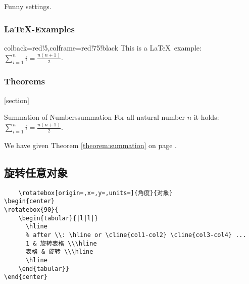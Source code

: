 \begin{tcolorbox}[skin=bicolor,colback=yellow!10,colframe=red!75!black,title=Here I am]
  
\end{tcolorbox}


\begin{tcolorbox}[colback=blue!50,colframe=blue!25!black,coltext=yellow,
    fontupper=\Large\bfseries,arc=6mm,boxrule=2mm,boxsep=5mm]
  Funny settings.
\end{tcolorbox}


\subsubsection{\LaTeX-Examples}

\begin{tcblisting}{colback=red!5,colframe=red!75!black}
This is a \LaTeX\ example:
$\displaystyle\sum\limits_{i=1}^n i = \frac{n(n+1)}{2}$.
\end{tcblisting}


\subsubsection{Theorems}

[section]
\def\themytheorem{\thesection.\arabic{mytheorem}}


\begin{theo}{Summation of Numbers}{summation}
  For all natural number $n$ it holds:\\[2mm]
  $\displaystyle\sum\limits_{i=1}^n i = \frac{n(n+1)}{2}$.
\end{theo}

We have given Theorem \ref{theorem:summation} on page \pageref{theorem:summation}.
\subsection{旋转任意对象}
\begin{shaded}
  \begin{Verbatim}
    \rotatebox[origin=,x=,y=,units=]{角度}{对象}
\begin{center}
\rotatebox{90}{
    \begin{tabular}{|l|l|}
      \hline
      % after \\: \hline or \cline{col1-col2} \cline{col3-col4} ...
      1 & 旋转表格 \\\hline
      表格 & 旋转 \\\hline
      \hline
    \end{tabular}}
\end{center}
  \end{Verbatim}
\end{shaded}

